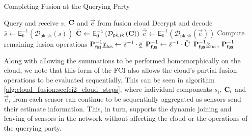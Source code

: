 \begin{algorithm}[htbp]
\caption{Completing Fusion at the Querying Party}\label{alg:cloud_fusion:secfci2_query_steps}
\begin{algorithmic}[1]
    \State Query and receive $s$, ${{\mathbf{C}}}$ and $\vec{e}$ from fusion cloud
    \LineComment Decrypt and decode
    \State $\bar{s} \gets \mathsf{E}^{-1}_{0}\left(\mathcal{D}_{\mathsf{pk},\mathsf{sk}}\left(s\right)\right)$
    \State $\bar{{{\mathbf{C}}}} \gets \mathsf{E}^{-1}_{0}\left(\mathcal{D}_{\mathsf{pk},\mathsf{sk}}\left({{\mathbf{C}}}\right)\right)$
    \State $\bar{\vec{e}} \gets \mathsf{E}^{-1}_{0}\left(\mathcal{D}_{\mathsf{pk},\mathsf{sk}}\left(\vec{e}\right)\right)$
    \LineComment Compute remaining fusion operations
    \State ${{\mathbf{P}}}_{\mathsf{fus}}^{-1}\hat{{\underline{x}}}_{\mathsf{fus}} \gets \bar{s}^{-1} \cdot \bar{{\underline{e}}}$
    \State ${{\mathbf{P}}}_{\mathsf{fus}}^{-1} \gets \bar{s}^{-1} \cdot \bar{{{\mathbf{C}}}}$
    \State \Return ${{\mathbf{P}}}_{\mathsf{fus}}^{-1}\hat{{\underline{x}}}_{\mathsf{fus}}$, ${{\mathbf{P}}}_{\mathsf{fus}}^{-1}$
    \EndProcedure
\end{algorithmic}
\end{algorithm}

Along with allowing the summations to be performed homomorphically on the cloud, we note that this form of the FCI also allows the cloud's partial fusion operations to be evaluated sequentially. This can be seen in algorithm \ref{alg:cloud_fusion:secfci2_cloud_steps}, where individual components $s_i$, ${{\mathbf{C}}}_i$ and $\vec{e}_i$ from each sensor can continue to be sequentially aggregated as sensors send their estimate information. This, in turn, supports the dynamic joining and leaving of sensors in the network without affecting the cloud or the operations of the querying party.

% 
% 

